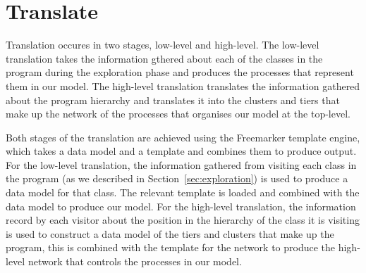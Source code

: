 \documentclass[10pt,a4paper]{article}
\begin{document}
\section{Translate}
\label{sec:translation}

Translation occures in two stages, low-level and high-level. The low-level translation takes the information gthered about each of the classes in the program during the exploration phase and produces the processes that represent them in our model. The high-level translation translates the information gathered about the program hierarchy and translates it into the clusters and tiers that make up the network of the processes that organises our model at the top-level.

Both stages of the translation are achieved using the Freemarker template engine, which takes a data model and a template and combines them to produce output. For the low-level translation, the information gathered from visiting each class in the program (as we described in Section~\ref{sec:exploration}) is used to produce a data model for that class. The relevant template is loaded and combined with the data model to produce our model. For the high-level translation, the information record by each visitor about the position in the hierarchy of the class it is visiting is used to construct a data model of the tiers and clusters that make up the program, this is combined with the template for the network to produce the high-level network that controls the processes in our model.
\end{document}
